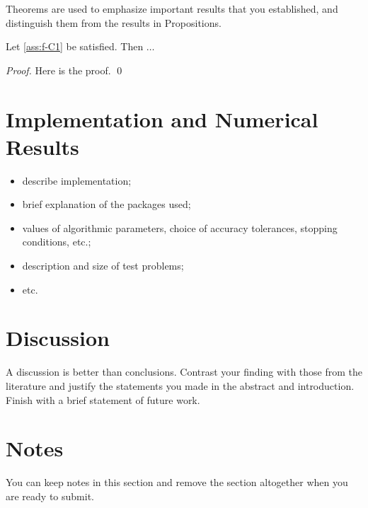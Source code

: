 \documentclass[runningheads,orivec,oribibl]{llncs}
\begin{document}
\begin{theorem}
  Theorems are used to emphasize important results that you established, and distinguish them from the results in Propositions.

  Let \autoref{ass:f-C1} be satisfied.
  Then \(\dots\)
\end{theorem}

\begin{proof}
  Here is the proof.
  \qed
\end{proof}


\section{Implementation and Numerical Results}
\label{sec:implementation}

\begin{itemize}
  \item describe implementation;
  \item brief explanation of the packages used;
  \item values of algorithmic parameters, choice of accuracy tolerances, stopping conditions, etc.;
  \item description and size of test problems;
  \item etc.
\end{itemize}


\section{Discussion}
\label{sec:discussion}

A discussion is better than conclusions.
Contrast your finding with those from the literature and justify the statements you made in the abstract and introduction.
Finish with a brief statement of future work.


\section{Notes}
\label{sec:notes}

You can keep notes in this section and remove the section altogether when you are ready to submit.
\end{document}
